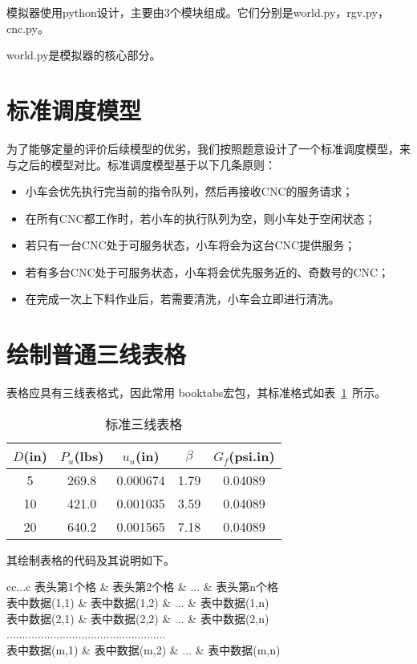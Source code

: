 \documentclass{cumcmthesis}
\begin{document}
模拟器使用python设计，主要由3个模块组成。它们分别是world.py，rgv.py，cnc.py。

world.py是模拟器的核心部分。

\section{标准调度模型}
为了能够定量的评价后续模型的优劣，我们按照题意设计了一个标准调度模型，来与之后的模型对比。标准调度模型基于以下几条原则：
\begin{itemize}
    \item 小车会优先执行完当前的指令队列，然后再接收CNC的服务请求；
    \item 在所有CNC都工作时，若小车的执行队列为空，则小车处于空闲状态；
    \item 若只有一台CNC处于可服务状态，小车将会为这台CNC提供服务；
    \item 若有多台CNC处于可服务状态，小车将会优先服务近的、奇数号的CNC；
    \item 在完成一次上下料作业后，若需要清洗，小车会立即进行清洗。
\end{itemize}


\section{绘制普通三线表格}
表格应具有三线表格式，因此常用 booktabs宏包，其标准格式如表~\ref{tab001}~所示。
\begin{table}[!htbp]
\caption{标准三线表格}\label{tab001} \centering
\begin{tabular}{ccccc}
\toprule[1.5pt]
$D$(in) & $P_u$(lbs) & $u_u$(in) & $\beta$ & $G_f$(psi.in)\\
\midrule[1pt]
 5 & 269.8 & 0.000674 & 1.79 & 0.04089\\
10 & 421.0 & 0.001035 & 3.59 & 0.04089\\
20 & 640.2 & 0.001565 & 7.18 & 0.04089\\
\bottomrule[1.5pt]
\end{tabular}
\end{table}

其绘制表格的代码及其说明如下。
\begin{tcode}
\begin{table}[!htbp]
\caption[标签名]{中文标题}
\begin{tabular}{cc...c}
\toprule[1.5pt]
表头第1个格   & 表头第2个格   & ... & 表头第n个格  \\
\midrule[1pt]
表中数据(1,1) & 表中数据(1,2) & ... & 表中数据(1,n)\\
表中数据(2,1) & 表中数据(2,2) & ... & 表中数据(2,n)\\
...................................................\\
表中数据(m,1) & 表中数据(m,2) & ... & 表中数据(m,n)\\
\bottomrule[1.5pt]
\end{tabular}
\end{table}
\end{tcode}
\end{document}
